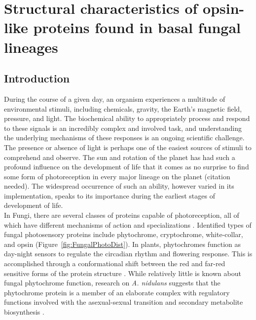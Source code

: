 \chapter{Structural characteristics of opsin-like proteins found in basal fungal lineages}
\label{chap:RhodStruct}
\section{Introduction}
During the course of a given day, an organism experiences a multitude of environmental stimuli, including chemicals, gravity, the Earth's magnetic field, pressure, and light. The biochemical ability to appropriately process and respond to these signals is an incredibly complex and involved task, and understanding the underlying mechanisms of these responses is an ongoing scientific challenge. \\
\indent The presence or absence of light is perhaps one of the easiest sources of stimuli to comprehend and observe. The sun and rotation of the planet has had such a profound influence on the development of life that it comes as no surprise to find some form of photoreception in every major lineage on the planet (citation needed). The widespread occurrence of such an ability, however varied in its implementation, speaks to its importance during the earliest stages of development of life. \\
\indent In Fungi, there are several classes of proteins capable of photoreception, all of which have different mechanisms of action and specializations \cite{Idnurm2010}. Identified types of fungal photosensory proteins include phytochrome, cryptochrome, white-collar, and opsin \cite{Idnurm2010} (Figure~\ref{fig:FungalPhotoDist}). In plants, phytochromes function as day-night sensors to regulate the circadian rhythm and flowering response. This is accomplished through a conformational shift between the red and far-red sensitive forms of the protein structure \cite{Rockwell2006}. While relatively little is known about fungal phytochrome function, research on \textit{A. nidulans} suggests that the phytochrome protein is a member of an elaborate complex with regulatory functions involved with the asexual-sexual transition and secondary metabolite biosynthesis \cite{Idnurm2010}.\\
